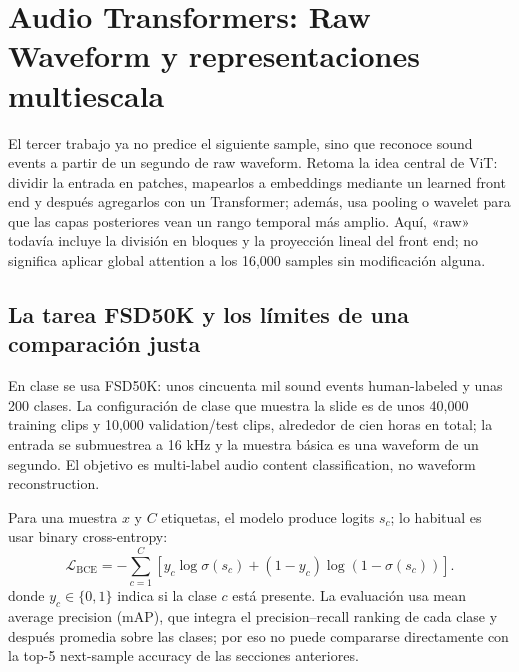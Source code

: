 \section{Audio Transformers: Raw Waveform y representaciones multiescala}

El tercer trabajo ya no predice el siguiente sample, sino que reconoce sound events a partir de un segundo de raw waveform. Retoma la idea central de ViT: dividir la entrada en patches, mapearlos a embeddings mediante un learned front end y después agregarlos con un Transformer; además, usa pooling o wavelet para que las capas posteriores vean un rango temporal más amplio. Aquí, «raw» todavía incluye la división en bloques y la proyección lineal del front end; no significa aplicar global attention a los 16,000 samples sin modificación alguna.


\subsection{La tarea FSD50K y los límites de una comparación justa}

En clase se usa FSD50K: unos cincuenta mil sound events human-labeled y unas 200 clases. La configuración de clase que muestra la slide es de unos 40,000 training clips y 10,000 validation/test clips, alrededor de cien horas en total; la entrada se submuestrea a 16 kHz y la muestra básica es una waveform de un segundo. El objetivo es multi-label audio content classification, no waveform reconstruction.


Para una muestra $x$ y $C$ etiquetas, el modelo produce logits $s_c$; lo habitual es usar binary cross-entropy:
\[
\mathcal{L}_{\mathrm{BCE}}
=-\sum_{c=1}^{C}
\left[y_c\log\sigma(s_c)+(1-y_c)\log(1-\sigma(s_c))\right].
\]
donde $y_c\in\{0,1\}$ indica si la clase $c$ está presente. La evaluación usa mean average precision (mAP), que integra el precision--recall ranking de cada clase y después promedia sobre las clases; por eso no puede compararse directamente con la top-5 next-sample accuracy de las secciones anteriores.

